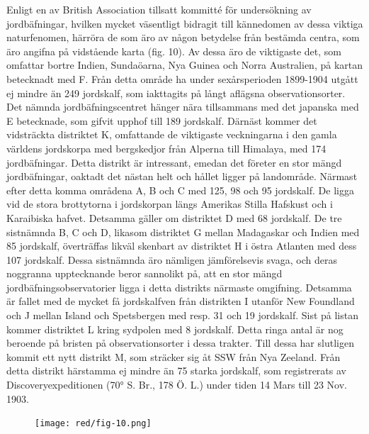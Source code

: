\documentclass[a4paper, 12pt, oneside, swedish]{article}
\begin{document}
Enligt en av British Association tillsatt kommitté för undersökning av jordbäfningar, hvilken mycket väsentligt bidragit till kännedomen av dessa viktiga naturfenomen, härröra de som äro av någon betydelse från bestämda centra, som äro angifna på vidstående karta (fig. 10). Av dessa äro de viktigaste det, som omfattar bortre Indien, Sundaöarna, Nya Guinea och Norra Australien, på kartan betecknadt med F. Från detta område ha under sexårsperioden 1899-1904 utgått ej mindre än 249 jordskalf, som iakttagits på långt aflägsna observationsorter. Det nämnda jordbäfningscentret hänger nära tillsammans med det japanska med E betecknade, som gifvit upphof till 189 jordskalf. Därnäst kommer det vidsträckta distriktet K, omfattande de viktigaste veckningarna i den gamla världens jordskorpa med bergskedjor från Alperna till Himalaya, med 174 jordbäfningar. Detta distrikt är intressant, emedan det företer en stor mängd jordbäfningar, oaktadt det nästan helt och hållet ligger på landområde. Närmast efter detta komma områdena A, B och C med 125, 98 och 95 jordskalf. De ligga vid de stora brottytorna i jordskorpan längs Amerikas Stilla Hafskust och i Karaibiska hafvet. Detsamma gäller om distriktet D med 68 jordskalf. De tre sistnämnda B, C och D, likasom distriktet G mellan Madagaskar och Indien med 85 jordskalf, överträffas likväl skenbart av distriktet H i östra Atlanten med dess 107 jordskalf. Dessa sistnämnda äro nämligen jämförelsevis svaga, och deras noggranna upptecknande beror sannolikt på, att en stor mängd jordbäfningsobservatorier ligga i detta distrikts närmaste omgifning. Detsamma är fallet med de mycket få jordskalfven från distrikten I utanför New Foundland och J mellan Island och Spetsbergen med resp. 31 och 19 jordskalf. Sist på listan kommer distriktet L kring sydpolen med 8 jordskalf. Detta ringa antal är nog beroende på bristen på observationsorter i dessa trakter. Till dessa har slutligen kommit ett nytt distrikt M, som sträcker sig åt SSW från Nya Zeeland. Från detta distrikt härstamma ej mindre än 75 starka jordskalf, som registrerats av Discoveryexpeditionen (70° S. Br., 178 Ö. L.) under tiden 14 Mars till 23 Nov. 1903.

\begin{figure}[H]
\centering
\texttt{[image: red/fig-10.png]}
\caption{}
\end{figure}
\end{document}
